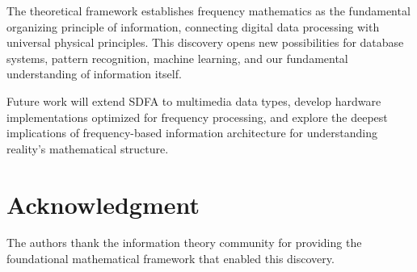 \documentclass[journal]{IEEEtran}
\newcommand{\sdfa}{\textsc{SDFA}}
\begin{document}
The theoretical framework establishes frequency mathematics as the fundamental organizing principle of information, connecting digital data processing with universal physical principles. This discovery opens new possibilities for database systems, pattern recognition, machine learning, and our fundamental understanding of information itself.

Future work will extend \sdfa{} to multimedia data types, develop hardware implementations optimized for frequency processing, and explore the deepest implications of frequency-based information architecture for understanding reality's mathematical structure.

\section*{Acknowledgment}
The authors thank the information theory community for providing the foundational mathematical framework that enabled this discovery.



\end{document}
